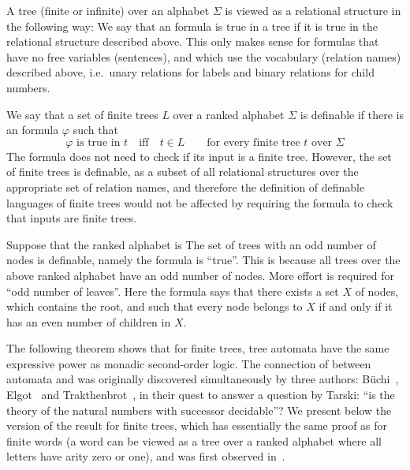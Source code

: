 A  tree   (finite or infinite) over an alphabet $\Sigma$ is viewed as a relational structure in the following way:
We say that an \mso formula is true in a tree if it is true in the relational structure described above. This only makes sense for formulas that have no free variables (sentences), and which use the vocabulary (relation names) described above, i.e.~unary relations for labels and binary relations for child numbers. 

We say that a set of finite trees $L$ over a ranked alphabet $\Sigma$ is \mso definable if there is an \mso formula $\varphi$ such that $$  \text{$\varphi$ is true in $t$} \quad \mbox{iff} \quad t \in L \qquad \mbox{for every finite tree $t$ over $\Sigma$}$$
The formula does not need to check if its input is a finite tree. However, the set of finite trees is \mso definable, as a subset of all relational structures over the appropriate set of relation names, and therefore the definition of \mso definable languages of finite trees would not be affected by requiring the formula to check that inputs are finite trees. 



\begin{example}
	Suppose that the ranked alphabet is 
	The set of trees with an odd number of nodes is \mso definable, namely the formula is ``true''. This is because all trees over the above ranked alphabet have an odd number of nodes. More effort is required for ``odd number of leaves''. Here the formula says that there exists a set $X$ of nodes, which contains the root, and such that every node belongs to $X$ if and only if it has an even number of children in $X$.
\end{example}

The following theorem shows that for finite trees, tree automata have the same expressive power as monadic second-order logic.
The connection of between automata and \mso was originally discovered simultaneously by three authors: Büchi~\cite{Buchi:1960bh}, Elgot~\cite{Elgot:1961fq} and Trakthenbrot~\cite{Trakthenbrot:1962ud}, in their quest to answer a question by Tarski: ``is the \mso theory of the natural numbers with successor decidable''?  We present below the version of the result for finite trees, which has essentially the same proof as for finite words (a word can be viewed as a tree over a ranked alphabet where all letters have arity zero or one), and was first observed in~\cite{Thatcher:1968fs}.

